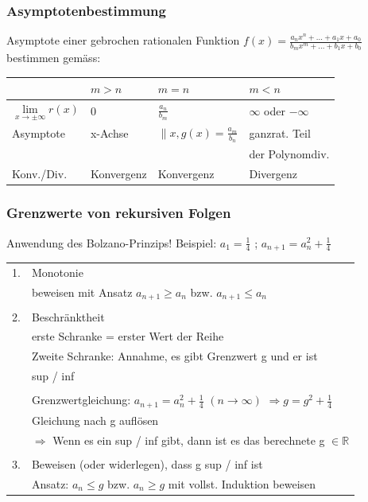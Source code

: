 		\subsubsection{Asymptotenbestimmung}
			Asymptote einer gebrochen rationalen Funktion $f(x) = \frac{a_nx^n + ... + a_1x + a_0}{b_mx^m + ... + b_1x + b_0}$\\
			bestimmen gemäss:
			
			\begin{tabular}{|l|l|l|l|}
				\hline
				& $m > n$ & $m = n$ & $m < n$ \\
				\hline
				$\lim\limits_{x\to \pm \infty} r(x)$  & 0 & $\frac{a_n}{b_m}$ & $\infty$ oder $-\infty$ \\
				\hline
				Asymptote & x-Achse & $\parallel x, g(x) = \frac{a_m}{b_n}$ & ganzrat. Teil \\
				          &         &                                        & der Polynomdiv. \\
				\hline
				Konv./Div. & Konvergenz & Konvergenz & Divergenz \\
				\hline
			\end{tabular}
			
		\columnbreak
			
		\subsubsection{Grenzwerte von rekursiven Folgen}
			Anwendung des Bolzano-Prinzips!  Beispiel: $a_1 = \frac{1}{4}$ ; $a_{n+1} = a_n^2 + \frac{1}{4}$ \\
			
			\begin{tabular}{ll}
				1. & Monotonie \\
				   & beweisen mit Ansatz $a_{n+1} \geq a_n$ bzw. $a_{n+1} \leq a_n$ \\
				\\
				2. & Beschränktheit \\
				   & erste Schranke = erster Wert der Reihe \\
				   & Zweite Schranke: Annahme, es gibt Grenzwert g und er ist \\
				   & sup / inf \\
				\\
				   & Grenzwertgleichung: $a_{n+1} = a_n ^2 + \frac{1}{4}$  $(n \rightarrow \infty)$ $\Rightarrow g = g^2 + \frac{1}{4}$ \\
				   & Gleichung nach g auflösen \\
				   & $\Rightarrow$ Wenn es ein sup / inf gibt, dann ist es das berechnete g $\in \mathbb{R}$\\
				\\
				3. & Beweisen (oder widerlegen), dass g sup / inf ist \\
				   & Ansatz: $a_n \leq g$ bzw. $a_n \geq g$ mit vollst. Induktion beweisen \\
			\end{tabular}

	\vfill\null
	\pagebreak
